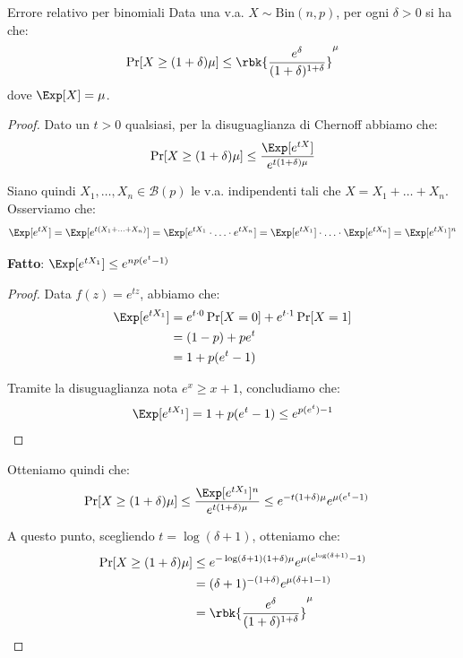 \documentclass[a4paper, 12pt]{report}
\begin{document}
    \begin{framedprop}{Errore relativo per binomiali}
        Data una v.a. $X \sim \mathrm{Bin}(n,p)$, per ogni $\delta > 0$ si ha che:
        \[\Pr[X \geq (1+\delta) \mu] \leq \rbk{\frac{e^\delta}{(1+\delta)^{1+\delta}}}^\mu\]
        dove $\Exp[X] = \mu$.
    \end{framedprop}

    \begin{proof}
        Dato un $t > 0$ qualsiasi, per la disuguaglianza di Chernoff abbiamo che:
        \[\Pr[X \geq (1+\delta) \mu] \leq \frac{\Exp[e^{tX}]}{e^{t(1+\delta)\mu}}\]

        Siano quindi $X_1, \ldots, X_n \in \mathcal{B}(p)$ le v.a. indipendenti tali che $X = X_1 + \ldots + X_n$. Osserviamo che:
        \[\Exp[e^{tX}] = \Exp[e^{t(X_1+ \ldots + X_n)}] = \Exp[e^{tX_1} \cdot \ldots \cdot e^{tX_n}] = \Exp[e^{tX_1}] \cdot \ldots \cdot \Exp[e^{tX_n}] = \Exp[e^{tX_1}]^n\]

        \textbf{Fatto}: $\Exp[e^{tX_1}] \leq e^{np(e^t-1)}$
        
        \begin{proof}
            Data $f(z) = e^{tz}$, abbiamo che:
            \[\begin{split}
                \Exp[e^{tX_1}] &= e^{t\cdot 0} \Pr[X = 0] + e^{t \cdot 1} \Pr[X = 1] \\
                &= (1-p) + pe^t \\
                &= 1+p(e^t-1)
            \end{split}\]

            Tramite la disuguaglianza nota $e^x \geq x+1$, concludiamo che:
            \[\Exp[e^{tX_1}] = 1+p(e^t-1) \leq e^{p(e^t)-1}\]
        \end{proof}

        Otteniamo quindi che:
        \[\begin{split}
            \Pr[X \geq (1+\delta) \mu] &\leq \frac{\Exp[e^{tX_1}]^n}{e^{t(1+\delta)\mu}} \leq  e^{-t(1+\delta)\mu} e^{\mu(e^t-1)}
        \end{split}\]

        A questo punto, scegliendo $t = \log(\delta + 1)$, otteniamo che:
        \[\begin{split}
            \Pr[X \geq (1+\delta) \mu] &\leq  e^{-\log(\delta+1) (1+\delta)\mu} e^{\mu(e^{\log(\delta+1)}-1)}\\
            &= (\delta+1)^{-(1+\delta)} e^{\mu(\delta+1-1)} \\
            &= \rbk{\frac{e^\delta}{(1+\delta)^{1+\delta}}}^\mu
        \end{split}\]
    \end{proof}
\end{document}
